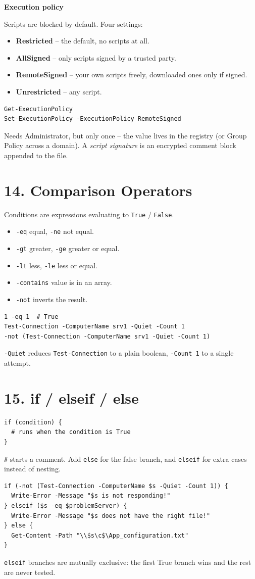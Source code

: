 \textbf{Execution policy}

Scripts are blocked by default. Four settings:
\begin{itemize}
\item \textbf{Restricted} -- the default, no scripts at all.
\item \textbf{AllSigned} -- only scripts signed by a trusted party.
\item \textbf{RemoteSigned} -- your own scripts freely, downloaded ones only if signed.
\item \textbf{Unrestricted} -- any script.
\end{itemize}
\begin{verbatim}
Get-ExecutionPolicy
Set-ExecutionPolicy -ExecutionPolicy RemoteSigned
\end{verbatim}
Needs Administrator, but only once -- the value lives in the registry (or Group Policy across a domain). A \emph{script signature} is an encrypted comment block appended to the file.

\section{14. Comparison Operators}
Conditions are expressions evaluating to \texttt{True} / \texttt{False}.
\begin{itemize}
\item \texttt{-eq} equal, \texttt{-ne} not equal.
\item \texttt{-gt} greater, \texttt{-ge} greater or equal.
\item \texttt{-lt} less, \texttt{-le} less or equal.
\item \texttt{-contains} value is in an array.
\item \texttt{-not} inverts the result.
\end{itemize}
\begin{verbatim}
1 -eq 1  # True
Test-Connection -ComputerName srv1 -Quiet -Count 1
-not (Test-Connection -ComputerName srv1 -Quiet -Count 1)
\end{verbatim}
\texttt{-Quiet} reduces \texttt{Test-Connection} to a plain boolean, \texttt{-Count 1} to a single attempt.

\section{15. if / elseif / else}
\begin{verbatim}
if (condition) {
  # runs when the condition is True
}
\end{verbatim}
\texttt{\#} starts a comment. Add \texttt{else} for the false branch, and \texttt{elseif} for extra cases instead of nesting.
\begin{verbatim}
if (-not (Test-Connection -ComputerName $s -Quiet -Count 1)) {
  Write-Error -Message "$s is not responding!"
} elseif ($s -eq $problemServer) {
  Write-Error -Message "$s does not have the right file!"
} else {
  Get-Content -Path "\\$s\c$\App_configuration.txt"
}
\end{verbatim}
\texttt{elseif} branches are mutually exclusive: the first True branch wins and the rest are never tested.

